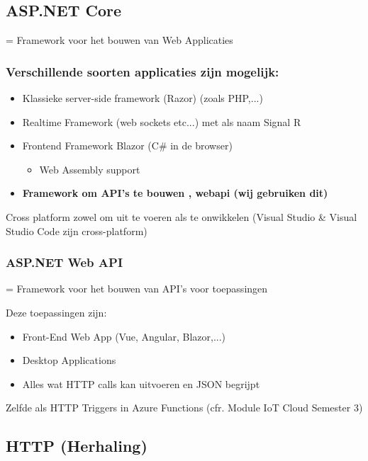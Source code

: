 \documentclass{article}
\begin{document}
\subsection{ASP.NET Core}

= Framework voor het bouwen van Web Applicaties

\subsubsection{Verschillende soorten applicaties zijn mogelijk:}

\begin{itemize}
    \item Klassieke server-side framework (Razor) (zoals PHP,...)
    \item Realtime Framework (web sockets etc...) met als naam Signal R
    \item Frontend Framework Blazor (C\# in de browser)
    \begin{itemize}
        \item Web Assembly support
    \end{itemize}
    \item \textbf{Framework om API’s te bouwen , webapi (wij gebruiken dit)}
\end{itemize}

Cross platform zowel om uit te voeren als te onwikkelen (Visual Studio \& Visual Studio Code zijn cross-platform)

\subsubsection{ASP.NET Web API}

= Framework voor het bouwen van API’s voor toepassingen

Deze toepassingen zijn:

\begin{itemize}
    \item Front-End Web App (Vue, Angular, Blazor,...)
    \item Desktop Applications
    \item Alles wat HTTP calls kan uitvoeren en JSON begrijpt
\end{itemize}

Zelfde als HTTP Triggers in Azure Functions (cfr. Module IoT Cloud Semester 3)

\subsection{HTTP (Herhaling)}
\end{document}
